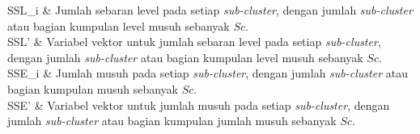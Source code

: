 \begin{conditions}
	SSL_{i} & Jumlah sebaran level pada setiap \textit{sub-cluster}, dengan jumlah \textit{sub-cluster} atau bagian kumpulan level musuh sebanyak $Sc$.\\
	SSL' & Variabel vektor untuk jumlah sebaran level pada setiap \textit{sub-cluster}, dengan jumlah \textit{sub-cluster} atau bagian kumpulan level musuh sebanyak $Sc$.\\
	SSE_{i} & Jumlah musuh pada setiap \textit{sub-cluster}, dengan jumlah \textit{sub-cluster} atau bagian kumpulan musuh sebanyak $Sc$.\\
	SSE' & Variabel vektor untuk jumlah musuh pada setiap \textit{sub-cluster}, dengan jumlah \textit{sub-cluster} atau bagian kumpulan jumlah musuh sebanyak $Sc$.\\
\end{conditions}
\newpage

